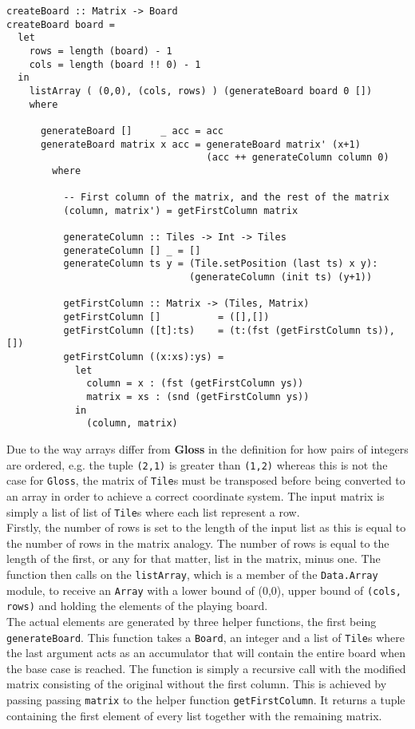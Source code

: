 \documentclass{article}
\begin{document}
\begin{verbatim}
createBoard :: Matrix -> Board
createBoard board =
  let
    rows = length (board) - 1
    cols = length (board !! 0) - 1
  in
    listArray ( (0,0), (cols, rows) ) (generateBoard board 0 [])
    where

      generateBoard []     _ acc = acc
      generateBoard matrix x acc = generateBoard matrix' (x+1)
                                   (acc ++ generateColumn column 0)
        where

          -- First column of the matrix, and the rest of the matrix
          (column, matrix') = getFirstColumn matrix

          generateColumn :: Tiles -> Int -> Tiles
          generateColumn [] _ = []
          generateColumn ts y = (Tile.setPosition (last ts) x y):
                                (generateColumn (init ts) (y+1))

          getFirstColumn :: Matrix -> (Tiles, Matrix)
          getFirstColumn []          = ([],[])
          getFirstColumn ([t]:ts)    = (t:(fst (getFirstColumn ts)), [])
          getFirstColumn ((x:xs):ys) =
            let
              column = x : (fst (getFirstColumn ys))
              matrix = xs : (snd (getFirstColumn ys))
            in
              (column, matrix)
\end{verbatim}
Due to the way arrays differ from \textbf{Gloss} in the definition for how pairs of integers are ordered, e.g. the tuple \texttt{(2,1)} is greater than \texttt{(1,2)} whereas this is not the case for \texttt{Gloss}, the matrix of \texttt{Tile}s must be transposed before being converted to an array in order to achieve a correct coordinate system. The input matrix is simply a list of list of \texttt{Tile}s where each list represent a row.\\
 \newline
 Firstly, the number of rows is set to the length of the input list as this is equal to the number of rows in the matrix analogy. The number of rows is equal to the length of the first, or any for that matter, list in the matrix, minus one. The function then calls on the \texttt{listArray}, which is a member of the \texttt{Data.Array} module, to receive an \texttt{Array} with a lower bound of (0,0), upper bound of \texttt{(cols, rows)} and holding the elements of the playing board.\\
 \newline
 The actual elements are generated by three helper functions, the first being \texttt{generateBoard}. This function takes a \texttt{Board}, an integer and a list of \texttt{Tile}s where the last argument acts as an accumulator that will contain the entire board when the base case is reached. The function is simply a recursive call with the modified matrix consisting of the original without the first column. This is achieved by passing passing \texttt{matrix} to the helper function \texttt{getFirstColumn}. It returns a tuple containing the first element of every list together with the remaining matrix. \\
\end{document}
